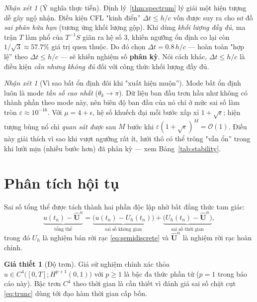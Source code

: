 \documentclass[11pt,a4paper]{article}
\theoremstyle{plain}
\theoremstyle{definition}
\newtheorem{assumption}[theorem]{Giả thiết}
\theoremstyle{remark}
\newtheorem{remark}[theorem]{Nhận xét}
\newcommand{\dt}{\Delta t}
\newcommand{\Uvec}{\bm{U}}
\begin{document}
\begin{remark}[Ý nghĩa thực tiễn]
\label{rem:key}
Định lý~\ref{thm:spectrum} lý giải một hiện tượng dễ gây ngộ nhận. Điều kiện CFL
"kinh điển'' $\dt \le h/c$ vốn được suy ra cho sơ đồ \emph{sai phân hữu hạn}
(tương ứng khối lượng gộp). Khi dùng \emph{khối lượng đầy đủ}, ma trận $T$
làm phổ của $T^{-1}S$ giãn ra hệ số $3$, khiến ngưỡng ổn định co lại còn
$1/\sqrt{3} \approx 57.7\%$ giá trị quen thuộc. Do đó chọn
$\dt = 0.8\,h/c$ --- hoàn toàn "hợp lệ'' theo $\dt \le h/c$ --- sẽ khiến
nghiệm số \textbf{phân kỳ}. Nói cách khác, $\dt \le h/c$ là điều kiện
\emph{cần nhưng không đủ} đối với công thức khối lượng đầy đủ.
\end{remark}

\begin{remark}[Vì sao bất ổn định đôi khi "xuất hiện muộn'']
\label{rem:roundoff}
Mode bất ổn định luôn là mode \emph{tần số cao nhất}
($\theta_{k} \to \pi$). Dữ liệu ban đầu trơn hầu như không có thành phần
theo mode này, nên biên độ ban đầu của nó chỉ ở mức sai số làm tròn
$\varepsilon \approx 10^{-16}$. Với $\mu = 4 + \epsilon$, hệ số khuếch đại
mỗi bước xấp xỉ $1 + \sqrt{\epsilon}$; hiện tượng bùng nổ chỉ \emph{quan sát
được} sau $M$ bước khi
$\varepsilon(1+\sqrt{\epsilon})^{M} = \mathcal{O}(1)$. Điều này giải thích
vì sao khi vượt ngưỡng rất ít, lưới thô có thể trông "vẫn ổn'' trong khi
lưới mịn (nhiều bước hơn) đã phân kỳ --- xem Bảng~\ref{tab:stability}.
\end{remark}

\section{Phân tích hội tụ}
\label{sec:hoitu}

Sai số tổng thể được tách thành hai phần độc lập nhờ bất đẳng thức tam giác:
\begin{equation}
\label{eq:split}
  \underbrace{u(t_{n}) - \hat{\Uvec}^{n}}_{\text{tổng thể}}
  = \underbrace{\bigl(u(t_{n}) - U_{h}(t_{n})\bigr)}_{\text{sai số không gian}}
  + \underbrace{\bigl(U_{h}(t_{n}) - \hat{\Uvec}^{n}\bigr)}
    _{\text{sai số thời gian}},
\end{equation}
trong đó $U_{h}$ là nghiệm bán rời rạc \eqref{eq:semidiscrete} và
$\hat{\Uvec}^{n}$ là nghiệm rời rạc hoàn chỉnh.

\begin{assumption}[Độ trơn]
\label{ass:smooth}
Giả sử nghiệm chính xác thỏa
$u \in C^{4}\bigl([0,T]; H^{p+1}(0,1)\bigr)$ với $p \ge 1$ là bậc đa thức
phần tử ($p=1$ trong báo cáo này). Bậc trơn $C^{4}$ theo thời gian là cần
thiết vì đánh giá sai số chặt cụt \eqref{eq:trunc} dùng tới đạo hàm thời gian
cấp bốn.
\end{assumption}
\end{document}
